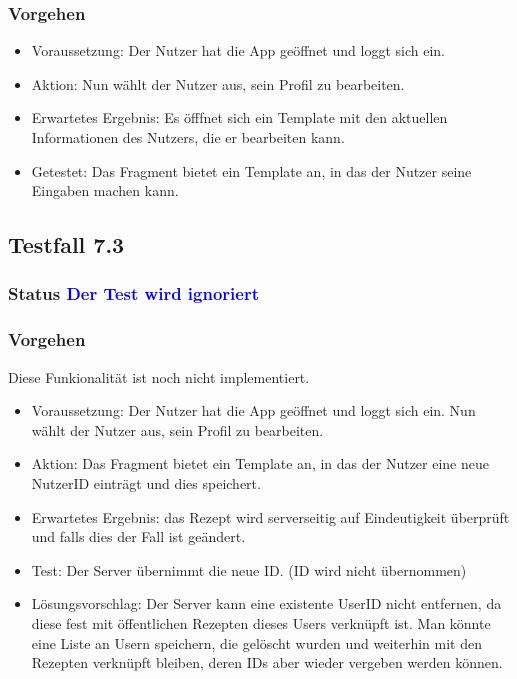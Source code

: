 \subsubsection{Vorgehen}
\begin{itemize}
\item Voraussetzung: Der Nutzer hat die App geöffnet und loggt sich ein.
\item Aktion:  Nun wählt der Nutzer aus, sein Profil zu bearbeiten. 
\item Erwartetes Ergebnis: Es öfffnet sich ein Template mit den aktuellen Informationen des Nutzers, die er bearbeiten kann. 
\item Getestet: Das Fragment bietet ein Template an, in das der Nutzer seine Eingaben machen kann.
\end{itemize}


\subsection{Testfall 7.3}
\subsubsection{Status \textcolor{blue}{ Der Test wird ignoriert}}
\subsubsection{Vorgehen}
Diese Funkionalität ist noch nicht implementiert. 
\begin{itemize}
\item Voraussetzung: Der Nutzer hat die App geöffnet und loggt sich ein. Nun wählt der Nutzer aus, sein Profil zu bearbeiten. 
\item Aktion:  Das Fragment bietet ein Template an, in das der Nutzer eine neue NutzerID einträgt und dies speichert.
\item Erwartetes Ergebnis: das Rezept wird serverseitig auf Eindeutigkeit überprüft und falls dies der Fall ist geändert. 
\item Test: Der Server übernimmt die neue ID. (ID wird nicht übernommen)
\item Lösungsvorschlag: Der Server kann eine existente UserID nicht entfernen, da diese fest mit öffentlichen Rezepten dieses Users verknüpft ist. Man könnte eine Liste an Usern speichern, die gelöscht wurden und weiterhin mit den Rezepten verknüpft bleiben, deren IDs aber wieder vergeben werden können. 
\end{itemize}


